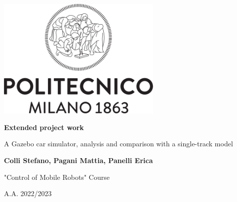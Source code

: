 \begin{titlepage}
	\begin{center}
		\includegraphics[width=0.6\textwidth]{img/Logo_Politecnico_Milano}
		
		\vspace{4cm}
		
		\huge
		\textbf{Extended project work}
		
		\vspace{0.3cm}
		
		\Large
		A Gazebo car simulator, analysis and comparison with a single-track model
		
		\vspace{1.5cm}
		
		\Large
		\textbf{Colli Stefano, Pagani Mattia, Panelli Erica}
		
		\vfill
		
		\large
		"Control of Mobile Robots" Course
		
		A.A. 2022/2023
	\end{center}
\end{titlepage}
